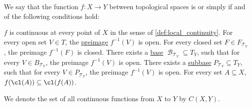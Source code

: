 \begin{definition}\label{def:global_continuity}
  We say that the function \( f: X \to Y \) between topological spaces is  or simply  if and of the following conditions hold:
  \begin{thmenum}
     \( f \) is continuous at every point of \( X \) in the sense of \cref{def:local_continuity}.
     For every open set \( V \in T \), the \hyperref[def:set_valued_function/inverse]{preimage} \( f^{-1}(V) \) is open.
     For every closed set \( F \in F_{\mscrT_Y} \), the preimage \( f^{-1}(F) \) is closed.
     There exists a \hyperref[def:topological_base]{base} \( \mscrB_{\mscrT_Y} \subseteq T_Y \), such that for every \( V \in B_{\mscrT_Y} \), the preimage \( f^{-1}(V) \) is open.
     There exists a \hyperref[def:topological_subbase]{subbase} \( P_{\mscrT_Y} \subseteq T_Y \), such that for every \( V \in P_{\mscrT_Y} \), the preimage \( f^{-1}(V) \) is open.
     For every set \( A \subseteq X \), \( f(\cl(A)) \subseteq \cl(f(A)) \).
  \end{thmenum}

  We denote the set of all continuous functions from \( X \) to \( Y \) by \( C(X, Y) \).
\end{definition}
